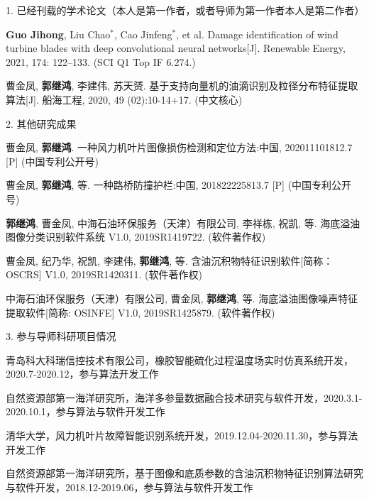 
\begin{resume}

1. 已经刊载的学术论文（本人是第一作者，或者导师为第一作者本人是第二作者）

\begin{publications}[before*=\vspace{1em},after*=\vspace{1em}]
  \item \textbf{Guo Jihong}, Liu Chao$^\ast$, Cao Jinfeng$^\ast$, et al. Damage identification of wind turbine blades with deep convolutional neural networks[J]. Renewable Energy, 2021, 174: 122–133. (SCI Q1 Top IF 6.274.)
  \item 曹金凤, \textbf{郭继鸿}, 李建伟, 苏天赟. 基于支持向量机的油滴识别及粒径分布特征提取算法[J]. 船海工程, 2020, 49 (02):10-14+17. (中文核心)
\end{publications}

2. 其他研究成果 %

\begin{achievements}[before*=\vspace{1em},after*=\vspace{1em}]
  \item 曹金凤, \textbf{郭继鸿}. 一种风力机叶片图像损伤检测和定位方法:中国, 202011101812.7 [P] (中国专利公开号)
  \item 曹金凤, \textbf{郭继鸿}, 等. 一种路桥防撞护栏:中国, 201822225813.7 [P] (中国专利公开号)
  \item \textbf{郭继鸿}, 曹金凤, 中海石油环保服务（天津）有限公司, 李祥栋, 祝凯, 等. 海底溢油图像分类识别软件系统 V1.0, 2019SR1419722. (软件著作权)
  \item 曹金凤, 纪乃华, 祝凯, 李建伟, \textbf{郭继鸿}, 等. 含油沉积物特征识别软件[简称：OSCRS] V1.0, 2019SR1420311. (软件著作权)
  \item 中海石油环保服务（天津）有限公司, 曹金凤, \textbf{郭继鸿}, 等. 海底溢油图像噪声特征提取软件[简称: OSINFE] V1.0, 2019SR1425879. (软件著作权)
\end{achievements}

3. 参与导师科研项目情况

\begin{achievements}[before*=\vspace{1em},after*=\vspace{1em}]
  \item 青岛科大科瑞信控技术有限公司，橡胶智能硫化过程温度场实时仿真系统开发，2020.7-2020.12，参与算法开发工作
  \item 自然资源部第一海洋研究所，海洋多参量数据融合技术研究与软件开发，2020.3.1-2020.10.1，参与算法与软件开发工作
  \item 清华大学，风力机叶片故障智能识别系统开发，2019.12.04-2020.11.30，参与算法开发工作
  \item 自然资源部第一海洋研究所，基于图像和底质参数的含油沉积物特征识别算法研究与软件开发，2018.12-2019.06，参与算法与软件开发工作
\end{achievements}

\end{resume}
